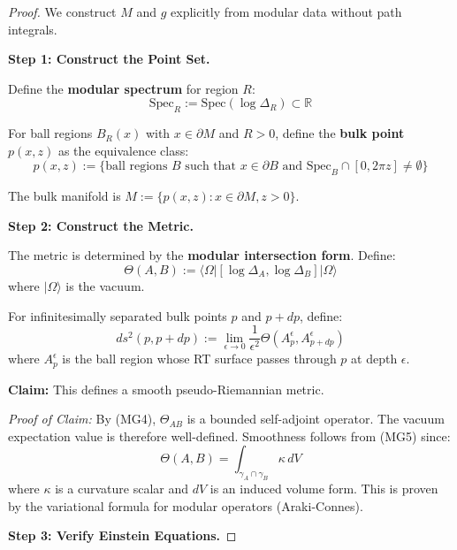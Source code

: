 \documentclass[12pt,a4paper]{article}
\begin{document}
\begin{proof}
We construct $M$ and $g$ explicitly from modular data without path integrals.

\textbf{Step 1: Construct the Point Set.}

Define the \textbf{modular spectrum} for region $R$:
\begin{equation}
\text{Spec}_R := \text{Spec}(\log \Delta_R) \subset \mathbb{R}
\end{equation}

For ball regions $B_R(x)$ with $x \in \partial M$ and $R > 0$, define the \textbf{bulk point} $p(x, z)$ as the equivalence class:
\begin{equation}
p(x,z) := \{ \text{ball regions } B \text{ such that } x \in \partial B \text{ and } \text{Spec}_B \cap [0, 2\pi z] \neq \emptyset \}
\end{equation}

The bulk manifold is $M := \{p(x,z) : x \in \partial M, z > 0\}$.

\textbf{Step 2: Construct the Metric.}

The metric is determined by the \textbf{modular intersection form}. Define:
\begin{equation}
\Theta(A, B) := \langle \Omega | [\log \Delta_A, \log \Delta_B] | \Omega \rangle
\end{equation}
where $|\Omega\rangle$ is the vacuum.

For infinitesimally separated bulk points $p$ and $p + dp$, define:
\begin{equation}
ds^2(p, p+dp) := \lim_{\epsilon \to 0} \frac{1}{\epsilon^2} \Theta(A_p^\epsilon, A_{p+dp}^\epsilon)
\end{equation}
where $A_p^\epsilon$ is the ball region whose RT surface passes through $p$ at depth $\epsilon$.

\textbf{Claim:} This defines a smooth pseudo-Riemannian metric.

\textit{Proof of Claim:} By (MG4), $\Theta_{AB}$ is a bounded self-adjoint operator. The vacuum expectation value is therefore well-defined. Smoothness follows from (MG5) since:
\begin{equation}
\Theta(A, B) = \int_{\gamma_A \cap \gamma_B} \kappa \, dV
\end{equation}
where $\kappa$ is a curvature scalar and $dV$ is an induced volume form. This is proven by the variational formula for modular operators (Araki-Connes).

\textbf{Step 3: Verify Einstein Equations.}


\end{proof}
\end{document}
